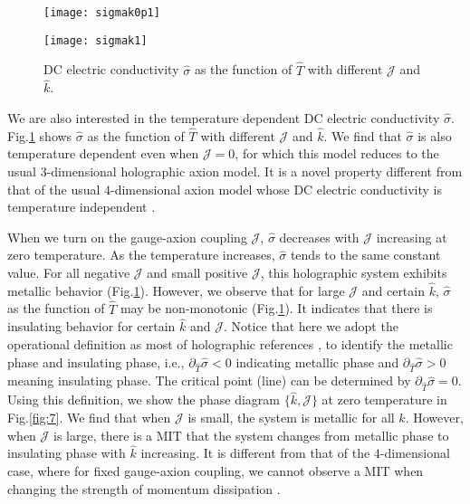 \documentclass[preprint,onecolumn,nofootinbib]{revtex4}
\begin{document}
\begin{figure}[H]
	\begin{minipage}[t]{0.45\linewidth}
		\centering
		\texttt{[image: sigmak0p1]}
	\end{minipage}
	\begin{minipage}[t]{0.5\linewidth}
		\centering
		\texttt{[image: sigmak1]}
	\end{minipage}
	\caption{DC electric conductivity $\hat{\sigma}$ as the function of $\hat{T}$ with different $\mathcal{J}$ and $\hat{k}$.}
	\label{fig:2}
\end{figure}
We are also interested in the temperature dependent DC electric conductivity $\hat{\sigma}$. Fig.\ref{fig:2} shows $\hat{\sigma}$ as the function of $\hat{T}$ with different $\mathcal{J}$ and $\hat{k}$. We find that $\hat{\sigma}$ is also temperature dependent even when $\mathcal{J}=0$, for which this model reduces to the usual 3-dimensional holographic axion model.
It is a novel property different from that of the usual $4$-dimensional axion model whose DC electric conductivity is temperature independent \cite{Andrade:2013gsa}.

When we turn on the gauge-axion coupling $\mathcal{J}$, $\hat{\sigma}$ decreases with $\mathcal{J}$ increasing at zero temperature. 
As the temperature increases, $\hat{\sigma}$ tends to the same constant value. 
For all negative $\mathcal{J}$ and small positive $\mathcal{J}$, this holographic system exhibits metallic behavior (Fig.\ref{fig:2}). However, we observe that for large $\mathcal{J}$ and certain $\hat{k}$, $\hat{\sigma}$ as the function of $\hat{T}$ may be non-monotonic (Fig.\ref{fig:2}). It indicates that there is insulating behavior for certain $\hat{k}$ and $\mathcal{J}$.
Notice that here we adopt the operational definition as most of holographic references \cite{Baggioli:2016rdj,Donos:2012js,Donos:2013eha,Donos:2014uba,Ling:2015ghh,Ling:2015dma,Ling:2015epa,Ling:2015exa,Ling:2016wyr,Ling:2016dck,Baggioli:2014roa,Baggioli:2016oqk,Baggioli:2016oju,Donos:2014oha,Liu:2021stu}, to identify the metallic phase and insulating phase, i.e., $\partial_{\hat{T}}\hat{\sigma}<0$ indicating metallic phase and $\partial_{\hat{T}}\hat{\sigma}>0$ meaning insulating phase. The critical point (line) can be determined by $\partial_{\hat{T}}\hat{\sigma}=0$. Using this definition, we show the phase diagram $\{\hat{k},\mathcal{J}\}$ at zero temperature in Fig.\ref{fig:7}. 
We find that when $\mathcal{J}$ is small, the system is metallic for all $\hat{k}$. However, when $\mathcal{J}$ is large, there is a MIT that the system changes from metallic phase to insulating phase with $\hat{k}$ increasing. 
It is different from that of the $4$-dimensional case, where for fixed gauge-axion coupling, we cannot observe a MIT when changing the strength of momentum dissipation \cite{Gouteraux:2016wxj,Baggioli:2016pia,Li:2018vrz,Liu:2022bam}.
\end{document}
